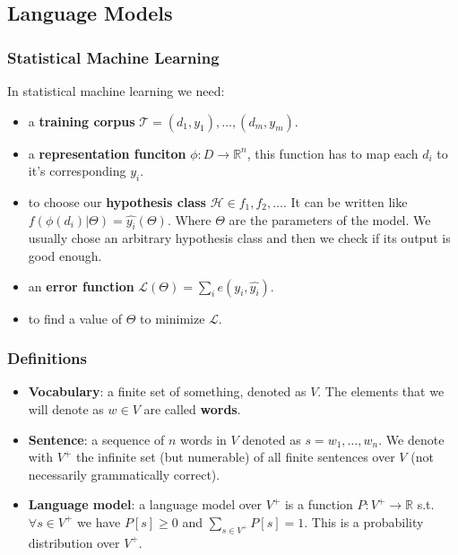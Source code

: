 \subsection{Language Models}
\label{sec:language_models}

\subsubsection{Statistical Machine Learning}

In statistical machine learning we need:
\begin{itemize}
    \item a \textbf{training corpus} $\mathcal{T}={(d_1,y_1),\dots,(d_m,y_m)}$.
    \item a \textbf{representation funciton} $\phi:D\rightarrow\mathbb{R}^n$, this
    function has to map each $d_i$ to it's corresponding $y_i$.
    \item to choose our \textbf{hypothesis class} $\mathcal{H}\in{f_1, f_2, \dots}$. It can be written like
    $f(\phi(d_i)|\Theta)=\hat{y_i}(\Theta)$. Where $\Theta$ are the parameters
    of the model. We usually chose an arbitrary hypothesis class and then we
    check if its output is good enough.
    \item an \textbf{error function} $\mathcal{L}(\Theta)=\sum_i e(y_i,\hat{y_i})$.
    \item to find a value of $\Theta$ to minimize $\mathcal{L}$.
\end{itemize}

\subsubsection{Definitions}

\begin{itemize}
    \item \textbf{Vocabulary}: a finite set of something, denoted as $V$.
    The elements that we will denote as $w\in V$ are called \textbf{words}.
    \item \textbf{Sentence}: a sequence of $n$ words in $V$ denoted as $s=w_1,\dots,w_n$.
    We denote with $V^+$ the infinite set (but numerable) of all finite sentences over 
    $V$ (not necessarily grammatically correct).
    \item \textbf{Language model}: a language model over $V^+$ is a function $P:V^+\rightarrow\mathbb{R}$
    s.t. $\forall s\in V^+$ we have $P[s]\geq 0$ and $\sum_{s\in V^+}P[s]=1$. This is a probability distribution
    over $V^+$.
\end{itemize}

